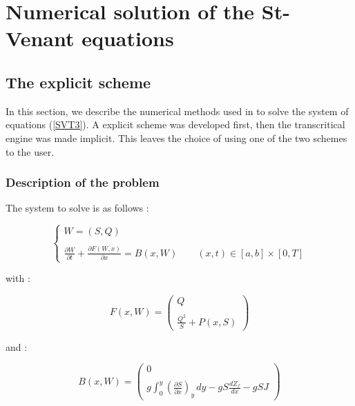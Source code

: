 \section{Numerical solution of the St-Venant equations}
\label{resNumSVT}

\subsection{The explicit scheme}
\label{SchemExp}

In this section, we describe the numerical methods used in \mascaret{} to solve the system of equations (\ref{SVT3}). A explicit scheme was developed first, then the transcritical engine was made implicit. This leaves the choice of using one of the two schemes to the user.

\subsubsection{Description of the problem}

The system to solve is as follows :

\begin{equation}
   \label{sys}
   \left \lbrace
  \begin{array}{l}
   W = (S,Q) \\
   \\
   \frac{\partial W}{\partial t} + \frac{\partial F(W,x)}{\partial x} = B(x,W) \qquad (x,t) \in [a,b] \times [0,T]
  \end{array}
 \right.
\end{equation}

with :

\begin{equation}
 F(x,W) = \left ( \begin{array}{c}
    Q\\
    \\
    \frac{Q^2}{S} + P(x,S)
\end{array}
\right )
\end{equation}

and :

\begin{equation}
 B(x,W) = \left ( \begin{array}{c}
    0\\
    \\
    g \int_{0}^y \left ( \frac{\partial S}{\partial x} \right )_y \, dy - g S \frac{dZ_f}{dx} - g S J
\end{array}
\right )
\end{equation}

